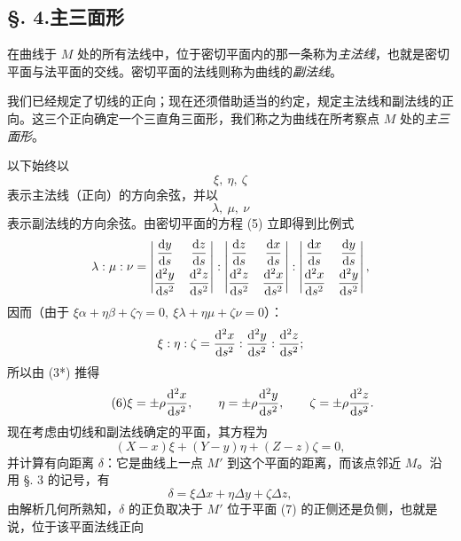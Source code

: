 \subsection*{§. 4.\quad 主三面形}
在曲线于 \(M\) 处的所有法线中，位于密切平面内的那一条称为\emph{主法线}，也就是密切平面与法平面的交线。密切平面的法线则称为曲线的\emph{副法线}。

我们已经规定了切线的正向；现在还须借助适当的约定，规定主法线和副法线的正向。这三个正向确定一个三直角三面形，我们称之为曲线在所考察点 \(M\) 处的\emph{主三面形}。

以下始终以
\[
\xi,\ \eta,\ \zeta
\]
表示主法线（正向）的方向余弦，并以
\[
\lambda,\ \mu,\ \nu
\]
表示副法线的方向余弦。由密切平面的方程 (5) 立即得到比例式
\[
\lambda:\mu:\nu=
\left|\begin{matrix}\dfrac{\mathrm{d} y}{\mathrm{d} s} & \dfrac{\mathrm{d} z}{\mathrm{d} s}\\[0.6em]
\dfrac{\mathrm{d}^2y}{\mathrm{d} s^2} & \dfrac{\mathrm{d}^2z}{\mathrm{d} s^2}\end{matrix}\right|
:
\left|\begin{matrix}\dfrac{\mathrm{d} z}{\mathrm{d} s} & \dfrac{\mathrm{d} x}{\mathrm{d} s}\\[0.6em]
\dfrac{\mathrm{d}^2z}{\mathrm{d} s^2} & \dfrac{\mathrm{d}^2x}{\mathrm{d} s^2}\end{matrix}\right|
:
\left|\begin{matrix}\dfrac{\mathrm{d} x}{\mathrm{d} s} & \dfrac{\mathrm{d} y}{\mathrm{d} s}\\[0.6em]
\dfrac{\mathrm{d}^2x}{\mathrm{d} s^2} & \dfrac{\mathrm{d}^2y}{\mathrm{d} s^2}\end{matrix}\right|,
\]
因而（由于 \(\xi\alpha+\eta\beta+\zeta\gamma=0,\ \xi\lambda+\eta\mu+\zeta\nu=0\)）：
\[
\xi:\eta:\zeta=\frac{\mathrm{d}^2x}{\mathrm{d} s^2}:\frac{\mathrm{d}^2y}{\mathrm{d} s^2}:\frac{\mathrm{d}^2z}{\mathrm{d} s^2};
\]
所以由 (3*) 推得
\begin{equation}\tag{6}
\xi=\pm\rho\frac{\mathrm{d}^2x}{\mathrm{d} s^2},\qquad
\eta=\pm\rho\frac{\mathrm{d}^2y}{\mathrm{d} s^2},\qquad
\zeta=\pm\rho\frac{\mathrm{d}^2z}{\mathrm{d} s^2}.
\end{equation}
现在考虑由切线和副法线确定的平面，其方程为
\begin{equation}\tag{7}
(X-x)\xi+(Y-y)\eta+(Z-z)\zeta=0,
\end{equation}
并计算有向距离 \(\delta\)：它是曲线上一点 \(M'\) 到这个平面的距离，而该点邻近 \(M\)。沿用 §. 3 的记号，有
\[
\delta=\xi\Delta x+\eta\Delta y+\zeta\Delta z,
\]
由解析几何所熟知，\(\delta\) 的正负取决于 \(M'\) 位于平面 (7) 的正侧还是负侧，也就是说，位于该平面法线正向

